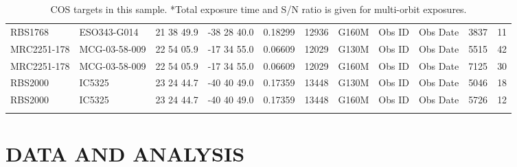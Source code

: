 \documentclass[iop]{emulateapj-rtx4}
\begin{document}
\begin{table}[ht]
\begin{center}
\begin{tabular}{l l l l l l l l l l c}
RBS1768  				&      ESO343-G014  	&	21  38  49.9  		&	-38  28  40.0  	&   0.18299  	& 12936		&   G160M	&   Obs ID  & Obs Date  & 3837  &       11           \\
MRC2251-178  			&      MCG-03-58-009  	& 	22  54  05.9  		&	-17  34  55.0  	&   0.06609  	& 12029		&   G130M	&   Obs ID  & Obs Date  & 5515  &       42           \\
MRC2251-178  			&      MCG-03-58-009  	& 	22  54  05.9  		&	-17  34  55.0  	&   0.06609  	& 12029		&   G160M	&   Obs ID  & Obs Date  & 7125  &       30           \\
RBS2000  				&      IC5325  			&      23  24  44.7  		&	-40  40  49.0  	&   0.17359  	& 13448		&   G130M	&   Obs ID  & Obs Date  & 5046  &       18           \\
RBS2000  				&      IC5325  			&      23  24  44.7  		&	-40  40  49.0  	&   0.17359  	& 13448		&   G160M	&   Obs ID  & Obs Date  & 5726  &       12           \\

 \\
\hline

\end{tabular}
\end{center}
  \caption{\small{COS targets in this sample. *Total exposure time and S/N ratio is given for multi-orbit exposures.}}
  \label{target_table}
\end{table}


\section{DATA AND ANALYSIS}
\end{document}
